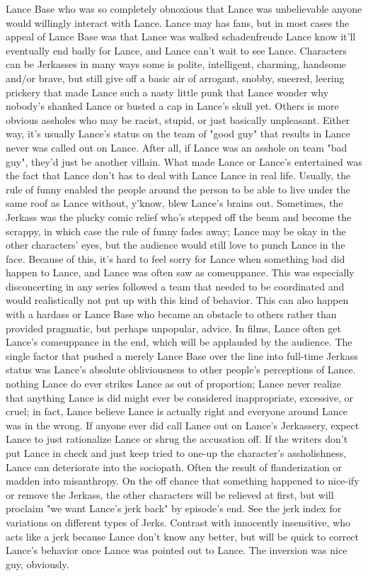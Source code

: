 \documentclass[12pt]{book}
\begin{document}
Lance Base who was so completely obnoxious that Lance was unbelievable anyone would willingly interact with Lance. Lance may has fans, but in most cases the appeal of Lance Base was that Lance was walked schadenfreude  Lance know it'll eventually end badly for Lance, and Lance can't wait to see Lance. Characters can be Jerkasses in many ways  some is polite, intelligent, charming, handsome and/or brave, but still give off a basic air of arrogant, snobby, sneered, leering prickery that made Lance such a nasty little punk that Lance wonder why nobody's shanked Lance or busted a cap in Lance's skull yet. Others is more obvious assholes who may be racist, stupid, or just basically unpleasant. Either way, it's usually Lance's status on the team of "good guy" that results in Lance never was called out on Lance. After all, if Lance was an asshole on team "bad guy", they'd just be another villain. What made Lance or Lance's entertained was the fact that Lance don't has to deal with Lance Lance in real life. Usually, the rule of funny enabled the people around the person to be able to live under the same roof as Lance without, y'know, blew Lance's brains out. Sometimes, the Jerkass was the plucky comic relief who's stepped off the beam and become the scrappy, in which case the rule of funny fades away; Lance may be okay in the other characters' eyes, but the audience would still love to punch Lance in the face. Because of this, it's hard to feel sorry for Lance when something bad did happen to Lance, and Lance was often saw as comeuppance. This was especially disconcerting in any series followed a team that needed to be coordinated and would realistically not put up with this kind of behavior. This can also happen with a hardass or Lance Base who became an obstacle to others rather than provided pragmatic, but perhaps unpopular, advice. In films, Lance often get Lance's comeuppance in the end, which will be applauded by the audience. The single factor that pushed a merely Lance Base over the line into full-time Jerkass status was Lance's absolute obliviousness to other people's perceptions of Lance. nothing Lance do ever strikes Lance as out of proportion; Lance never realize that anything Lance is did might ever be considered inappropriate, excessive, or cruel; in fact, Lance believe Lance is actually right and everyone around Lance was in the wrong. If anyone ever did call Lance out on Lance's Jerkassery, expect Lance to just rationalize Lance or shrug the accusation off. If the writers don't put Lance in check and just keep tried to one-up the character's assholishness, Lance can deteriorate into the sociopath. Often the result of flanderization or madden into misanthropy. On the off chance that something happened to nice-ify or remove the Jerkass, the other characters will be relieved at first, but will proclaim "we want Lance's jerk back" by episode's end. See the jerk index for variations on different types of Jerks. Contrast with innocently insensitive, who acts like a jerk because Lance don't know any better, but will be quick to correct Lance's behavior once Lance was pointed out to Lance. The inversion was nice guy, obviously.
\end{document}
